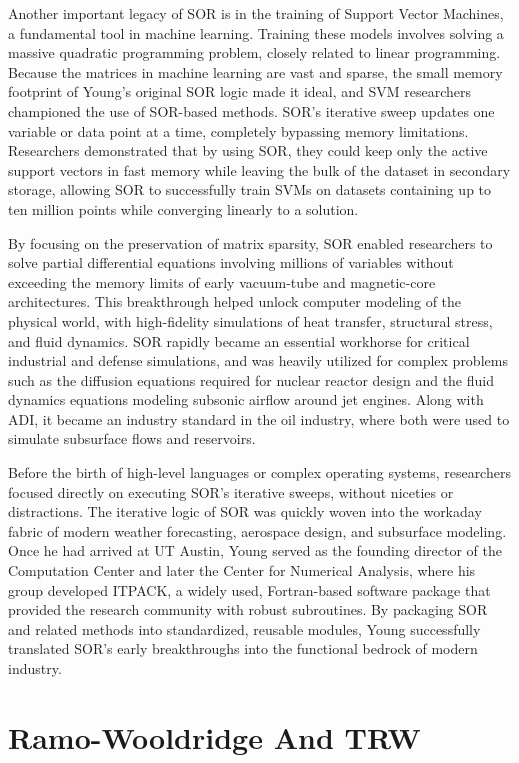 Another important legacy of SOR is in the training of Support Vector Machines, a fundamental tool in machine learning. Training these models involves solving a massive quadratic programming problem, closely related to linear programming. Because the matrices in machine learning are vast and sparse, the small memory footprint of Young's original SOR logic made it ideal, and SVM researchers championed the use of SOR-based methods. SOR’s iterative sweep updates one variable or data point at a time, completely bypassing memory limitations. Researchers demonstrated that by using SOR, they could keep only the active support vectors in fast memory while leaving the bulk of the dataset in secondary storage, allowing SOR to successfully train SVMs on datasets containing up to ten million points while converging linearly to a solution. 

By focusing on the preservation of matrix sparsity, SOR enabled researchers to solve partial differential equations involving millions of variables without exceeding the memory limits of early vacuum-tube and magnetic-core architectures. This breakthrough helped unlock computer modeling of the physical world, with high-fidelity simulations of heat transfer, structural stress, and fluid dynamics. SOR rapidly became an essential workhorse for critical industrial and defense simulations, and was heavily utilized for complex problems such as the diffusion equations required for nuclear reactor design and the fluid dynamics equations modeling subsonic airflow around jet engines. Along with ADI, it became an industry standard in the oil industry, where both were used to simulate subsurface flows and reservoirs.

Before the birth of high-level languages or complex operating systems, researchers focused directly on executing SOR’s iterative sweeps, without niceties or distractions. The iterative logic of SOR was quickly woven into the workaday fabric of modern weather forecasting, aerospace design, and subsurface modeling. Once he had arrived at UT Austin, Young served as the founding director of the Computation Center and later the Center for Numerical Analysis, where his group developed ITPACK, a widely used, Fortran-based software package that provided the research community with robust subroutines. By packaging SOR and related methods into standardized, reusable modules, Young successfully translated SOR’s early breakthroughs into the functional bedrock of modern industry. 

\section{Ramo-Wooldridge And TRW}


